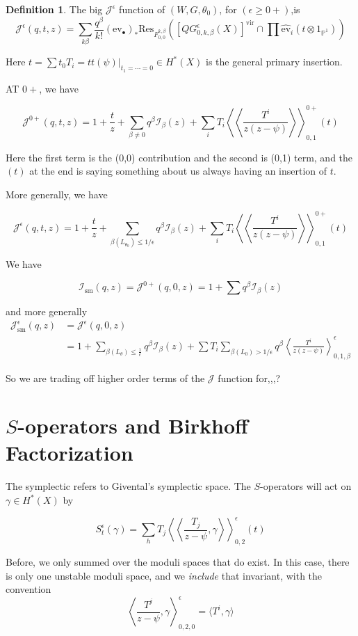 \documentclass{amsart}
\theoremstyle{definition}
\newtheorem{definition}[dummy]{Definition}
\newcommand{\I}{\mathcal{I}}
\newcommand{\proj}{\mathbb{P}}
\newcommand{\J}{\mathcal{J}}
\newcommand{\one}{1}
\newcommand{\ev}{\text{ev}}
\newcommand{\vir}{\text{vir}}
\begin{document}
\begin{definition}
The big $\J^\epsilon$ function of $(W,G,\theta_0)$, for $(\epsilon\geq 0+)$,is
$$\J^\epsilon(q,t,z)=\sum_{k\beta} \frac{q^\beta}{k!} (\ev_\bullet)_* \text{Res}_{F^{k,\beta}_{0,0}} \left([QG^\epsilon_{0,k,\beta}(X)]^\vir\cap\prod \hat{\ev}_i(t\otimes\one_{\proj^1})\right)$$

Here $t=\sum t_0T_i=tt(\psi)|_{t_1=\cdots=0}\in H^*(X)$ is the general primary insertion.

AT $0+$, we have

$$\J^{0+}(q,t,z)=\one+\frac{t}{z}+\sum_{\beta\neq 0} q^\beta \I_\beta(z)+\sum_i T_i\left\langle\left\langle\frac{T^i}{z(z-\psi)}\right\rangle\right\rangle^{0+}_{0,1} (t)$$

Here the first term is the (0,0) contribution and the second is (0,1) term, and the $(t)$ at the end is saying something about us always having an insertion of $t$.

More generally, we have

$$\J^{\epsilon}(q,t,z)=\one+\frac{t}{z}+\sum_{\beta(L_{\theta_0})\leq 1/\epsilon} q^\beta \I_\beta(z)+\sum_i T_i\left\langle\left\langle\frac{T^i}{z(z-\psi)}\right\rangle\right\rangle^{0+}_{0,1} (t)$$


We have

$$\I_{\text{sm}}(q,z)=\J^{0+}(q,0,z)=\one+\sum q^\beta\I_\beta(z)$$

and more generally
\begin{align*}
\J_\text{sm}^\epsilon(q,z)&=\J^\epsilon(q,0,z) \\
&=\one+\sum_{\beta(L_\theta)\leq \frac{1}{\epsilon}} q^\beta\I_\beta(z)+\sum T_i\sum_{\beta(L_0)>1/\epsilon} q^\beta \left\langle \frac{T^i}{z(z-\psi)}\right\rangle^\epsilon_{0,1,\beta}
\end{align*}

So we are trading off higher order terms of the $\J$ function for,,,?


\section{$S$-operators and Birkhoff Factorization}

The symplectic refers to Givental's symplectic space.
The $S$-operators will act on $\gamma\in H^*(X)$ by

$$S^\epsilon_t(\gamma)=\sum_{h}T_j\left\langle\left\langle\frac{ T_j}{z-\psi},\gamma\right\rangle\right\rangle^\epsilon_{0,2}(t)$$

Before, we only summed over the moduli spaces that do exist.  In this case, there is only one unstable moduli space, and we \emph{include} that invariant, with the convention
$$\left\langle \frac{T^j}{z-\psi},\gamma\right\rangle^\epsilon_{0,2,0}=\langle T^i,\gamma\rangle$$
\end{definition}
\end{document}
